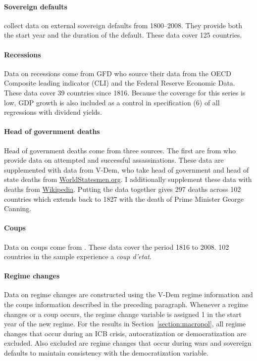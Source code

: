 \documentclass[12pt]{article}
\numberwithin{equation}{section}
\begin{document}
\paragraph{Sovereign defaults}
\cite{Reinhart2009} collect data on external sovereign defaults from 1800--2008. They provide both the start year and the duration of the default. These data cover 125 countries.

\paragraph{Recessions}
Data on recessions come from GFD who source their data from the OECD Composite leading indicator (CLI) and the Federal Reserve Economic Data. These data cover 39 countries since 1816. Because the coverage for this series is low, GDP growth is also included as a control in specification (6) of all regressions with dividend yields.

\paragraph{Head of government deaths}
Head of government deaths come from three sources. The first are from \cite{Jones2009} who provide data on attempted and successful assassinations. These data are supplemented with data from V-Dem, who take head of government and head of state deaths from \href{https://www.worldstatesmen.org/}{WorldStatesmen.org}. I additionally supplement these data with deaths from \href{https://en.wikipedia.org/wiki/List_of_heads_of_state_and_government_who_died_in_office}{Wikipedia}.  Putting the data together gives 297 deaths across 102 countries which extends back to 1827 with the death of Prime Minister George Canning.

\paragraph{Coups}
Data on coups come from \cite{Przeworski2013}. These data cover the period 1816 to 2008. 102 countries in the sample experience a \textit{coup d'etat}.

\paragraph{Regime changes}
Data on regime changes are constructed using the V-Dem regime information and the coups information described in the preceding paragraph. Whenever a regime changes or a coup occurs, the regime change variable is assigned 1 in the start year of the new regime. For the results in Section~\ref{section:macropol}, all regime changes that occur during an ICB crisis, autocratization or democratization are excluded. Also excluded are regime changes that occur during wars and sovereign defaults to maintain consistency with the democratization variable.
\end{document}
